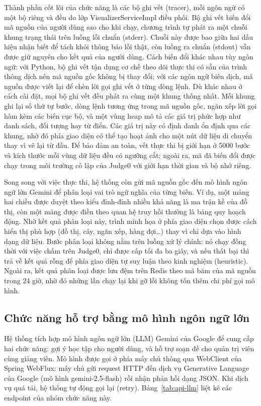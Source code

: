 \documentclass[12pt, a4paper]{report}
\begin{document}
Thành phần cốt lõi của chức năng là các bộ ghi vết (tracer), mỗi ngôn ngữ có một bộ riêng và
đều do lớp VisualizerServiceImpl điều phối. Bộ ghi vết biến đổi mã nguồn của người dùng sao cho
khi chạy, chương trình tự phát ra một chuỗi khung trạng thái trên luồng lỗi chuẩn (stderr).
Chuỗi này được bao giữa hai dấu hiệu nhận biết để tách khỏi thông báo lỗi thật, còn luồng ra
chuẩn (stdout) vẫn được giữ nguyên cho kết quả của người dùng. Cách biến đổi khác nhau tùy ngôn
ngữ: với Python, bộ ghi vết tận dụng cơ chế theo dõi thực thi có sẵn của trình thông dịch nên mã
nguồn gốc không bị thay đổi; với các ngôn ngữ biên dịch, mã nguồn được viết lại để chèn lời gọi
ghi vết ở từng dòng lệnh. Dù khác nhau ở cách cài đặt, mọi bộ ghi vết đều phát ra cùng một khung thống nhất. Mỗi khung ghi lại số thứ tự bước, dòng lệnh tương ứng trong mã nguồn gốc,
ngăn xếp lời gọi hàm kèm các biến cục bộ, và một vùng heap mô tả các giá trị phức hợp như danh
sách, đối tượng hay từ điển. Các giá trị này có định danh ổn định qua các khung, nhờ đó phía
giao diện có thể tạo hoạt ảnh cho một nút dữ liệu di chuyển thay vì vẽ lại từ đầu. Để bảo đảm an
toàn, vết thực thi bị giới hạn ở 5000 bước và kích thước mỗi vùng dữ liệu đều có ngưỡng cắt;
ngoài ra, mã đã biến đổi được chạy trong môi trường cô lập của Judge0 với giới hạn thời gian và
bộ nhớ riêng.

Song song với việc thực thi, hệ thống còn gửi mã nguồn gốc đến mô hình ngôn ngữ lớn Gemini để
phân loại vai trò ngữ nghĩa của từng biến. Ví dụ, một mảng hai chiều được duyệt theo kiểu
đỉnh-đỉnh nhiều khả năng là ma trận kề của đồ thị, còn một mảng được điền theo quan hệ truy hồi
thường là bảng quy hoạch động. Nhờ kết quả phân loại này, trình minh họa ở phía giao diện chọn
được cách hiển thị phù hợp (đồ thị, cây, ngăn xếp, hàng đợi\dots) thay vì chỉ dựa vào hình dạng
dữ liệu. Bước phân loại không nằm trên luồng xử lý chính: nó chạy đồng thời với việc chấm trên
Judge0, chỉ được cấp tối đa ba giây, và nếu thất bại thì trả về kết quả rỗng để phía giao diện
tự suy luận theo kinh nghiệm (heuristic). Ngoài ra, kết quả phân loại được lưu đệm trên Redis
theo mã băm của mã nguồn trong 24 giờ, nhờ đó những lần chạy lại khi gỡ lỗi không tốn thêm chi
phí gọi mô hình.

\subsection{Chức năng hỗ trợ bằng mô hình ngôn ngữ lớn}

Hệ thống tích hợp mô hình ngôn ngữ lớn (\ac{LLM}) Gemini của Google để cung cấp hai chức năng:
gợi ý học tập cho người dùng, và hỗ trợ soạn đề cho quản trị viên cùng giảng viên. Mô hình được
gọi ở phía máy chủ thông qua WebClient của Spring WebFlux: máy chủ gửi request \ac{HTTP} đến
dịch vụ Generative Language của Google (mô hình gemini-2.5-flash) rồi nhận phản hồi dạng
\ac{JSON}. Khi dịch vụ quá tải, hệ thống tự động gọi lại (retry). Bảng~\ref{tab:api-llm} liệt kê
các endpoint của nhóm chức năng này.
\end{document}
